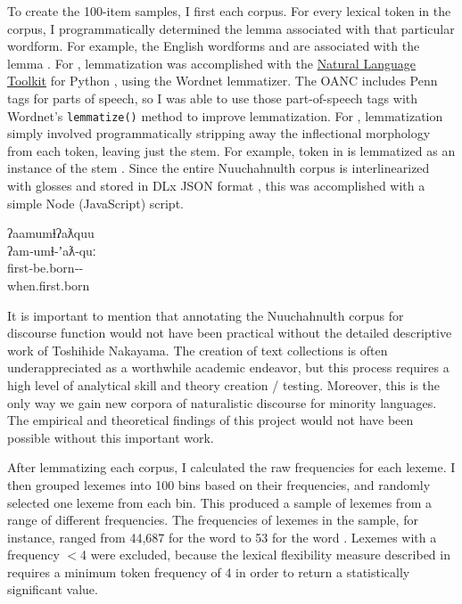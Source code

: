 To create the 100-item samples, I first  each corpus. For every lexical token in the corpus, I programmatically determined the lemma associated with that particular wordform. For example, the English wordforms  and  are associated with the lemma . For , lemmatization was accomplished with the \href{http://www.nltk.org/}{Natural Language Toolkit} for Python \parencite{BirdKleinLoper2009}, using the Wordnet lemmatizer. The OANC includes Penn tags for parts of speech, so I was able to use those part-of-speech tags with Wordnet's \texttt{lemmatize()} method to improve lemmatization. For , lemmatization simply involved programmatically stripping away the inflectional morphology from each token, leaving just the stem. For example, token in  is lemmatized as an instance of the stem  . Since the entire Nuuchahnulth corpus is interlinearized with glosses and stored in DLx JSON format \parencite{Hieber2021a}, this was accomplished with a simple Node (JavaScript) script.

\begin{exe}
  \ex\label{ex:3.1}
  \vfix
  \gllll ʔaamumɬʔaƛquu\\
         ʔam‑umɬ‑ʼaƛ‑quː\\
         first‑be.born‑‑\\
         when.first.born\\
         \vfix
\end{exe}

\noindent It is important to mention that annotating the Nuuchahnulth corpus for discourse function would not have been practical without the detailed descriptive work of Toshihide Nakayama. The creation of text collections is often underappreciated as a worthwhile academic endeavor, but this process requires a high level of analytical skill and theory creation / testing. Moreover, this is the only way we gain new corpora of naturalistic discourse for minority languages. The empirical and theoretical findings of this project would not have been possible without this important work.

After lemmatizing each corpus, I calculated the raw frequencies for each lexeme. I then grouped lexemes into 100 bins based on their frequencies, and randomly selected one lexeme from each bin. This produced a sample of lexemes from a range of different frequencies. The frequencies of lexemes in the  sample, for instance, ranged from 44,687 for the word  to 53 for the word . Lexemes with a frequency $<$4 were excluded, because the lexical flexibility measure described in  requires a minimum token frequency of 4 in order to return a statistically significant value.

